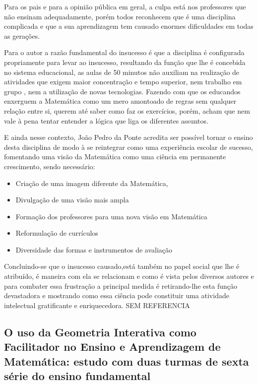 \documentclass[12pt,a4paper]{article}
\begin{document}
Para os pais e para a opinião pública em geral, a culpa está nos professores que não ensinam adequadamente, porém todos reconhecem que é uma disciplina complicada e que a sua aprendizagem tem causado enormes dificuldades em todas as gerações. 

Para o autor a razão fundamental do insucesso é que a disciplina é configurada propriamente para levar ao insucesso, resultando da função que lhe é concebida no sistema educacional, as aulas de 50 minutos não auxiliam na realização de atividades que exigem maior concentração e tempo superior, nem trabalho em grupo , nem a utilização de novas tecnologias. Fazendo com que os educandos enxerguem a Matemática como um mero amontoado de regras sem qualquer relação entre si, querem até saber como faz os exercícios, porém, acham que nem vale à pena tentar entender a lógica que liga os diferentes assuntos. 

E ainda nesse contexto, João Pedro da Ponte acredita ser possível tornar o ensino desta disciplina de modo à se reintegrar como uma experiência escolar de sucesso, fomentando uma visão da Matemática como uma ciência em permanente crescimento, sendo necessário: 

\begin{itemize}
	\item Criação de uma imagem diferente da Matemática,
	\item Divulgação de uma visão mais ampla 
	\item Formação dos professores para uma nova visão em Matemática 
	\item Reformulação de currículos 
	\item Diversidade das formas e instrumentos de avaliação 
\end{itemize}

Concluindo-se que o insucesso causado,está também no papel social que lhe é atribuído, é maneira com ela se relacionam e como é vista pelos diversos autores e para combater essa frustração a principal medida é retirando-lhe esta função devastadora e mostrando como essa ciência pode constituir uma atividade intelectual gratificante e enriquecedora. SEM REFERENCIA

\subsection{O uso da Geometria Interativa como Facilitador no Ensino e Aprendizagem de Matemática: 
estudo com duas turmas de sexta série do ensino fundamental}
\end{document}
